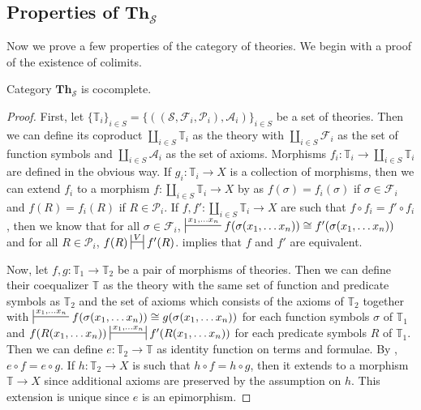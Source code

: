 \documentclass{amsart}
\theoremstyle{definition}
\theoremstyle{remark}
\newcommand{\cat}[1]{\mathbf{#1}}
\newcommand{\Th}{\cat{Th}}
\numberwithin{figure}{section}
\begin{document}
\subsection{Properties of $\Th_\mathcal{S}$}

Now we prove a few properties of the category of theories.
We begin with a proof of the existence of colimits.

\begin{prop}
Category $\Th_\mathcal{S}$ is cocomplete.
\end{prop}
\begin{proof}
First, let $\{ \mathbb{T}_i \}_{i \in S} = \{ ((\mathcal{S},\mathcal{F}_i,\mathcal{P}_i),\mathcal{A}_i) \}_{i \in S}$ be a set of theories.
Then we can define its coproduct $\coprod\limits_{i \in S} \mathbb{T}_i$ as the theory with $\coprod\limits_{i \in S} \mathcal{F}_i$ as the set of function symbols and $\coprod\limits_{i \in S} \mathcal{A}_i$ as the set of axioms.
Morphisms $f_i : \mathbb{T}_i \to \coprod\limits_{i \in S} \mathbb{T}_i$ are defined in the obvious way.
If $g_i : \mathbb{T}_i \to X$ is a collection of morphisms, then we can extend $f_i$ to a morphism $f : \coprod\limits_{i \in S} \mathbb{T}_i \to X$
by  as $f(\sigma) = f_i(\sigma)$ if $\sigma \in \mathcal{F}_i$ and $f(R) = f_i(R)$ if $R \in \mathcal{P}_i$.
If $f,f' : \coprod\limits_{i \in S} \mathbb{T}_i \to X$ are such that $f \circ f_i = f' \circ f_i$, then we know that for all
$\sigma \in \mathcal{F}_i$, $\sststile{}{x_1, \ldots x_n} f(\sigma(x_1, \ldots x_n)) \cong f'(\sigma(x_1, \ldots x_n))$ and for all $R \in \mathcal{P}_i$, $f(R) \ssststile{}{V} f'(R)$.
 implies that $f$ and $f'$ are equivalent.

Now, let $f,g : \mathbb{T}_1 \to \mathbb{T}_2$ be a pair of morphisms of theories.
Then we can define their coequalizer $\mathbb{T}$ as the theory with the same set of function and predicate symbols as $\mathbb{T}_2$ and the set of axioms which consists of the axioms of $\mathbb{T}_2$
together with $\sststile{}{x_1, \ldots x_n} f(\sigma(x_1, \ldots x_n)) \cong g(\sigma(x_1, \ldots x_n))$ for each function symbols $\sigma$ of $\mathbb{T}_1$
and $f(R(x_1, \ldots x_n)) \ssststile{}{x_1, \ldots x_n} f'(R(x_1, \ldots x_n))$ for each predicate symbols $R$ of $\mathbb{T}_1$.
Then we can define $e : \mathbb{T}_2 \to \mathbb{T}$ as identity function on terms and formulae.
By , $e \circ f = e \circ g$.
If $h : \mathbb{T}_2 \to X$ is such that $h \circ f = h \circ g$, then it extends to a morphism $\mathbb{T} \to X$ since additional axioms are preserved by the assumption on $h$.
This extension is unique since $e$ is an epimorphism.
\end{proof}
\end{document}
